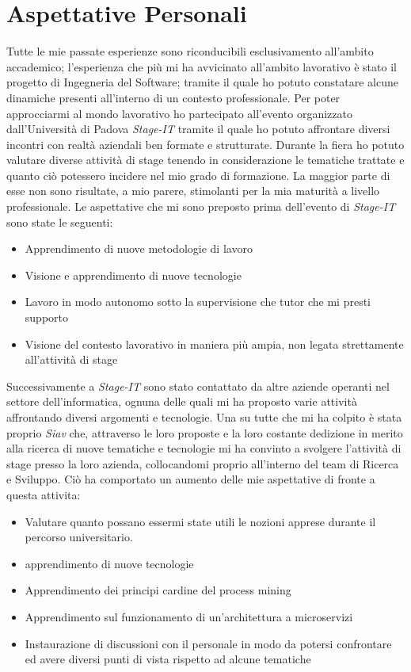 \section{Aspettative Personali}
Tutte le mie passate esperienze sono riconducibili esclusivamento all'ambito accademico; l'esperienza che più mi ha avvicinato all'ambito lavorativo è stato il progetto di Ingegneria del Software; tramite il quale ho potuto constatare alcune dinamiche presenti all'interno di un contesto professionale. Per poter approcciarmi al mondo lavorativo ho partecipato all'evento organizzato dall'Università di Padova \textit{Stage-IT} tramite il quale ho potuto affrontare diversi incontri con realtà aziendali ben formate e strutturate. Durante la fiera ho potuto valutare diverse attività di stage tenendo in considerazione le tematiche trattate e quanto ciò potessero incidere nel mio grado di formazione. La maggior parte di esse non sono risultate, a mio parere, stimolanti per la mia maturità a livello professionale. 
Le aspettative che mi sono preposto prima dell'evento di \textit{Stage-IT} sono state le seguenti:
\begin{itemize}
	\item Apprendimento di nuove metodologie di lavoro
	\item Visione e apprendimento di nuove tecnologie
	\item Lavoro in modo autonomo sotto la supervisione che tutor che mi presti supporto
	\item Visione del contesto lavorativo in maniera più ampia, non legata strettamente all'attività di stage
\end{itemize}
Successivamente a \textit{Stage-IT} sono stato contattato da altre aziende operanti nel settore dell'informatica, ognuna delle quali mi ha proposto varie attività affrontando diversi argomenti e tecnologie.
Una su tutte che mi ha colpito è stata proprio \textit{Siav} che, attraverso le loro proposte e la loro costante dedizione in merito alla ricerca di nuove tematiche e tecnologie mi ha convinto a svolgere l'attività di stage presso la loro azienda, collocandomi proprio all'interno del team di Ricerca e Sviluppo. Ciò ha comportato un aumento delle mie aspettative di fronte a questa attivita:
\begin{itemize}
	\item Valutare quanto possano essermi state utili le nozioni apprese durante il percorso universitario.
	\item apprendimento di nuove tecnologie
	\item Apprendimento dei principi cardine del process mining
	\item Apprendimento sul funzionamento di un'architettura a microservizi 
	\item Instaurazione di discussioni con il personale in modo da potersi confrontare ed avere diversi punti di vista rispetto ad alcune tematiche
	
\end{itemize}
